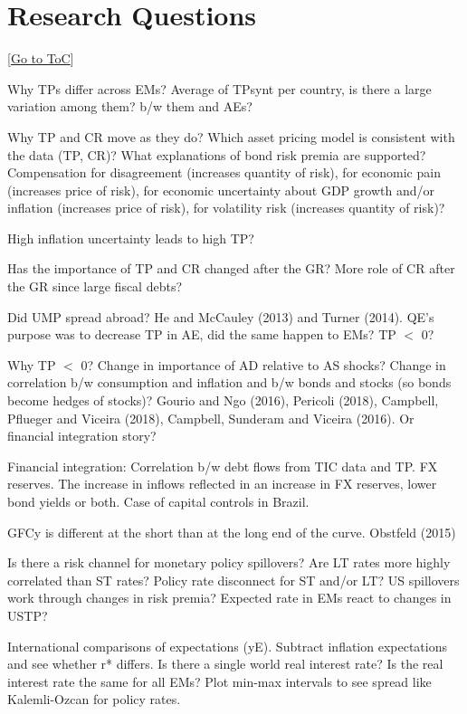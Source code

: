 \documentclass[12pt]{article}
\newcommand{\gototoc}{\vspace{-1.8cm} \null\hfill [\hyperlink{toc}{Go to ToC}] \newline}
\begin{document}
\section{Research Questions}
\gototoc
\begin{todolist}
	\item Why TPs differ across EMs? Average of TPsynt per country, is there a large variation among them? b/w them and AEs? 
	\item Why TP and CR move as they do? Which asset pricing model is consistent with the data (TP, CR)? What explanations of bond risk premia are supported? Compensation for disagreement (increases quantity of risk), for economic pain (increases price of risk), for economic uncertainty about GDP growth and/or inflation (increases price of risk), for volatility risk (increases quantity of risk)? \item High inflation uncertainty leads to high TP?
	\item Has the importance of TP and CR changed after the GR? More role of CR after the GR since large fiscal debts?
	\item Did UMP spread abroad? He and McCauley (2013) and Turner (2014). QE's purpose was to decrease TP in AE, did the same happen to EMs? TP \(<\) 0?
	\item Why TP \(<\) 0? Change in importance of AD relative to AS shocks? Change in correlation b/w consumption and inflation and b/w bonds and stocks (so bonds become hedges of stocks)? Gourio and Ngo (2016), Pericoli (2018), Campbell, Pflueger and Viceira (2018), Campbell, Sunderam and Viceira (2016). Or financial integration story?
	\item Financial integration: Correlation b/w debt flows from TIC data and TP. FX reserves. The increase in inflows reflected in an increase in FX reserves, lower bond yields or both. Case of capital controls in Brazil.
	\item GFCy is different at the short than at the long end of the curve. Obstfeld (2015)
	\item Is there a risk channel for monetary policy spillovers? Are LT rates more highly correlated than ST rates? Policy rate disconnect for ST and/or LT? US spillovers work through changes in risk premia? Expected rate in EMs react to changes in USTP?
	\item International comparisons of expectations (yE). Subtract inflation expectations and see whether r* differs. Is there a single world real interest rate? Is the real interest rate the same for all EMs? Plot min-max intervals to see spread like Kalemli-Ozcan for policy rates.

\end{todolist}
\end{document}

